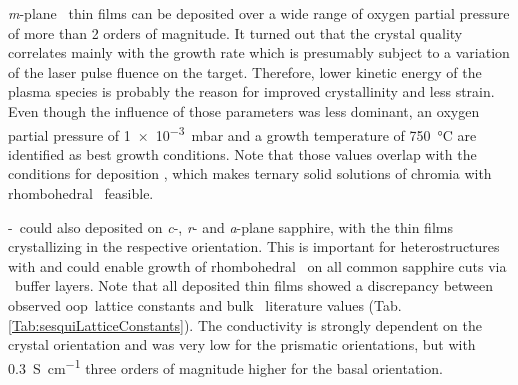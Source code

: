 \textit{m}-plane \cro\ thin films can be deposited over a wide range of oxygen partial pressure of more than 2 orders of magnitude.
It turned out that the crystal quality correlates mainly with the growth rate which is presumably subject to a variation of the laser pulse fluence on the target.
Therefore, lower kinetic energy of the plasma species is probably the reason for improved crystallinity and less strain.
Even though the influence of those parameters was less dominant, an oxygen partial pressure of \qty{1e-3}{\milli\bar} and a growth temperature of \qty{750}{\degreeCelsius} are identified as best growth conditions.
Note that those values overlap with the conditions for deposition \agao, which makes ternary solid solutions of chromia with rhombohedral \gao\ feasible.

\textalpha-\cro\ could also deposited on \textit{c}-, \textit{r}- and \textit{a}-plane sapphire, with the thin films crystallizing in the respective orientation.
This is important for heterostructures with \agao and could enable growth of rhombohedral \gao\ on all common sapphire cuts via \cro\ buffer layers.
Note that all deposited thin films showed a discrepancy between observed \gls{oop}\ lattice constants and bulk \cro\ literature values (Tab.\,\ref{Tab:sesquiLatticeConstants}).
The conductivity is strongly dependent on the crystal orientation and was very low for the prismatic orientations, but with \qty{0.3}{\siemens\per\cm} three orders of magnitude higher for the basal orientation.